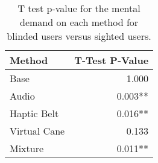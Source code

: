 
\begin{table}[!htb]
\centering
\caption{T test p-value for the mental demand on each method for blinded users versus sighted users.}
\label{tab:ttest_mental_demand}
\begin{tabular}{lr}
\toprule
      Method & T-Test P-Value \\
\midrule
        Base &          1.000 \\
       Audio &        0.003** \\
 Haptic Belt &        0.016** \\
Virtual Cane &          0.133 \\
     Mixture &        0.011** \\
\bottomrule
\end{tabular}
\end{table}

